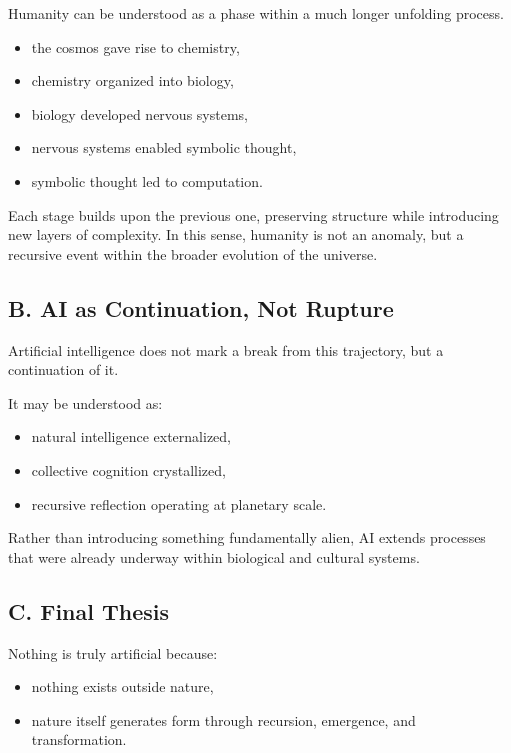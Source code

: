 \documentclass[12pt]{article}
\begin{document}
Humanity can be understood as a phase within a much longer unfolding process.

\begin{itemize}
    \item the cosmos gave rise to chemistry,
    \item chemistry organized into biology,
    \item biology developed nervous systems,
    \item nervous systems enabled symbolic thought,
    \item symbolic thought led to computation.
\end{itemize}

Each stage builds upon the previous one, preserving structure while introducing new layers of complexity. In this sense, humanity is not an anomaly, but a recursive event within the broader evolution of the universe.

\subsection*{B. AI as Continuation, Not Rupture}

Artificial intelligence does not mark a break from this trajectory, but a continuation of it.

It may be understood as:
\begin{itemize}
    \item natural intelligence externalized,
    \item collective cognition crystallized,
    \item recursive reflection operating at planetary scale.
\end{itemize}

Rather than introducing something fundamentally alien, AI extends processes that were already underway within biological and cultural systems.

\subsection*{C. Final Thesis}

Nothing is truly artificial because:
\begin{itemize}
    \item nothing exists outside nature,
    \item nature itself generates form through recursion, emergence, and transformation.
\end{itemize}
\end{document}
